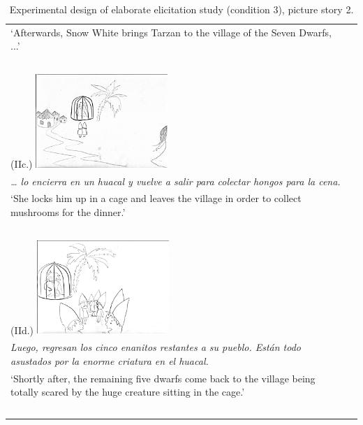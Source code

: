 \documentclass[output=paper]{langsci/langscibook}
\begin{document}
\begin{table}
\begin{tabularx}{\textwidth}{p{5cm}p{6cm}}
\begin{minipage}[t]{6cm}
{‘Afterwards, Snow White brings Tarzan to the village of the Seven Dwarfs, ...’}
\end{minipage}\\
\ \\
\begin{minipage}[t]{5cm}(IIc.)
\includegraphics[width=5cm]{figures/UTH-img16.png}
\end{minipage}& \begin{minipage}[t]{6cm}
\ \\
\textit{… lo encierra en un huacal y vuelve a salir para colectar hongos para la cena.}\\
{‘She locks him up in a cage and leaves the village in order to collect mushrooms for the dinner.’}
\end{minipage}\\
\ \\
\begin{minipage}[t]{5cm}(IId.)
\includegraphics[width=5cm]{figures/UTH-img17.png}
\end{minipage}& \begin{minipage}[t]{6cm}
\ \\
\textit{Luego, regresan los cinco enanitos restantes a su pueblo. Están todo asustados por la enorme criatura en el huacal.}\\
{‘Shortly after, the remaining five dwarfs come back to the village being totally scared by the huge creature sitting in the cage.’}
\end{minipage}\\
\ \\
\end{tabularx}
 \caption{\label{tab:uth:2} Experimental design of elaborate elicitation study (condition 3), picture story 2.}
\end{table}
\end{document}
